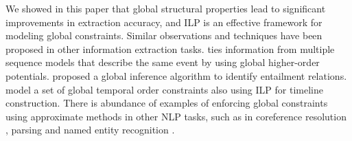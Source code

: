 
 
We showed in this paper that global structural properties lead to significant improvements in extraction accuracy, and ILP is an effective framework for modeling global constraints. Similar observations and techniques have been proposed in other information extraction tasks. 
 ties information from multiple sequence models that describe the same event by using global higher-order potentials. 
 proposed a global inference algorithm to identify entailment relations. 
 model a set of global temporal order constraints also using ILP for timeline construction. 
There is abundance of examples of enforcing global constraints using approximate methods in other NLP tasks, such as in coreference resolution \cite{Finkel08}, parsing \cite{Rush12} and named entity recognition \cite{Wang13}.
